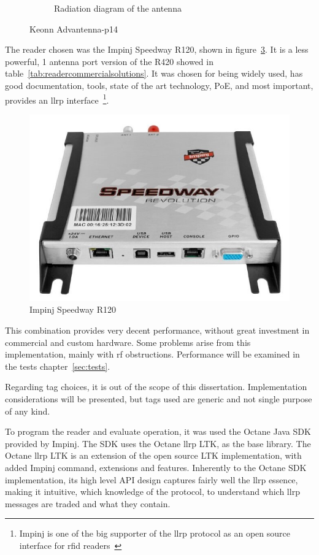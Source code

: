 \begin{figure}
\begin{subfigure}{.45\textwidth}
        \caption{Radiation diagram of the antenna} 
        \label{fig:advantennap14-radiation}
    \end{subfigure}
    \caption{Keonn Advantenna-p14~\cite{Advantennap14RFIDCompact}} 
    \label{fig:antennachoice}
\end{figure}

The reader chosen was the Impinj Speedway R120, shown in figure~\ref{fig:impinjr120}. It is a less powerful, 1 antenna port version of the R420 showed in table~\ref{tab:readercommercialsolutions}. It was chosen for being widely used, has good documentation, tools, state of the art technology, PoE, and most important, provides an \ac{llrp} interface~\footnote{Impinj is one of the big supporter of the \ac{llrp} protocol as an open source interface for \ac{rfid} readers~\cite{SevenRFIDOrganizations}}.

\begin{figure}
    \centering
    \includegraphics[width=0.6\linewidth]{./figs/Speedway_Revolution_R120.jpg}
    \caption{Impinj Speedway R120~\cite{ImpinjSolucoesRAIN}} 
    \label{fig:impinjr120}
\end{figure}

This combination provides very decent performance, without great investment in commercial and custom hardware. Some problems arise from this implementation, mainly with \ac{rf} obstructions. Performance will be examined in the tests chapter~\ref{sec:tests}.  

Regarding tag choices, it is out of the scope of this dissertation. Implementation considerations will be presented, but tags used are generic and not single purpose of any kind.

To program the reader and evaluate operation, it was used the Octane Java SDK provided by Impinj. 
The SDK uses the Octane \ac{llrp} LTK, as the base library. The Octane \ac{llrp} LTK is an extension of the open source LTK implementation, with added Impinj command, extensions and features.
Inherently to the Octane SDK implementation, its high level API design captures fairly well the \ac{llrp} essence, making it intuitive, which knowledge of the protocol, to understand which \ac{llrp} messages are traded and what they contain.

